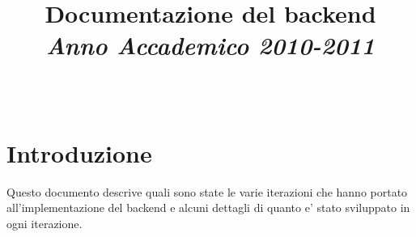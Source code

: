 \documentclass[10pt]{article}
\title{Documentazione del backend\\[2mm]{\small\emph{Anno Accademico 2010-2011}}\\[4mm]}
\author{\Nome\ \Cognome}
\begin{document}
\maketitle

\tableofcontents

\section{Introduzione}
Questo documento descrive quali sono state le varie iterazioni che hanno portato all'implementazione del backend e alcuni dettagli di quanto e' stato sviluppato in ogni iterazione.



\printindex
\end{document}

